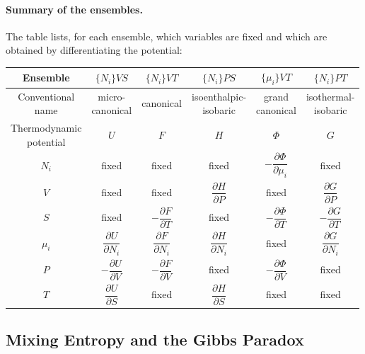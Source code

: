 \paragraph{Summary of the ensembles.}
The table lists, for each ensemble, which variables are fixed and which are
obtained by differentiating the potential:
\begin{center}
\renewcommand{\arraystretch}{2.6}

\begin{tabular}{|c|c|c|c|c|c|}
\hline
Ensemble & $\{N_i\}VS$ & $\{N_i\}VT$ & $\{N_i\}PS$ & $\{\mu_i\}VT$ & $\{N_i\}PT$ \\ \hline
\shortstack{Conventional\\name}
  & \shortstack{micro-\\canonical}
  & canonical
  & \shortstack{isoenthalpic-\\isobaric}
  & \shortstack{grand\\canonical}
  & \shortstack{isothermal-\\isobaric} \\ \hline \hline
\shortstack{Thermodynamic\\potential}
  & $U$ & $F$ & $H$ & $\Phi$ & $G$ \\ \hline
$N_i$
  & fixed & fixed & fixed
  & $-\dfrac{\partial \Phi}{\partial \mu_i}$ & fixed \\ \hline
$V$
  & fixed & fixed
  & $\dfrac{\partial H}{\partial P}$ & fixed
  & $\dfrac{\partial G}{\partial P}$ \\ \hline
$S$
  & fixed & $-\dfrac{\partial F}{\partial T}$ & fixed
  & $-\dfrac{\partial \Phi}{\partial T}$
  & $-\dfrac{\partial G}{\partial T}$ \\ \hline
$\mu_i$
  & $\dfrac{\partial U}{\partial N_i}$
  & $\dfrac{\partial F}{\partial N_i}$
  & $\dfrac{\partial H}{\partial N_i}$
  & fixed
  & $\dfrac{\partial G}{\partial N_i}$ \\ \hline
$P$
  & $-\dfrac{\partial U}{\partial V}$
  & $-\dfrac{\partial F}{\partial V}$ & fixed
  & $-\dfrac{\partial \Phi}{\partial V}$ & fixed \\ \hline
$T$
  & $\dfrac{\partial U}{\partial S}$ & fixed
  & $\dfrac{\partial H}{\partial S}$ & fixed & fixed \\
  \hline
\end{tabular}
\end{center}

\subsection{Mixing Entropy and the Gibbs Paradox}

